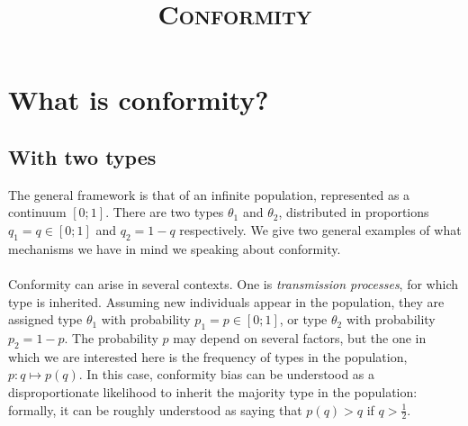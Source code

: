 \documentclass[12pt,a4paper]{article}		%
\title{\Large \scshape 
Conformity}
\date{}
\begin{document}
\maketitle









\vspace{20pt}







\section{What is conformity?}

\subsection{With two types}

The general framework is that of an infinite population, represented as a continuum $[0;1]$. There are two types $\theta_1$ and $\theta_2$, distributed in proportions $q_1 = q \in [0;1]$ and $q_2 = 1 - q$ respectively. We give two general examples of what mechanisms we have in mind we speaking about conformity.

\paragraph{}
Conformity can arise in several contexts. One is \emph{transmission processes}, for which type is inherited. Assuming new individuals appear in the population, they are assigned type $\theta_1$ with probability $p_1 = p \in [0;1]$, or type $\theta_2$ with probability $p_2 = 1 - p$. The probability $p$ may depend on several factors, but the one in which we are interested here is the frequency of types in the population, $p : q \mapsto p(q)$. In this case, conformity bias can be understood as a disproportionate likelihood to inherit the majority type in the population: formally, it can be roughly understood as saying that $p(q) > q$ if $q > \frac{1}{2}$.
\end{document}
